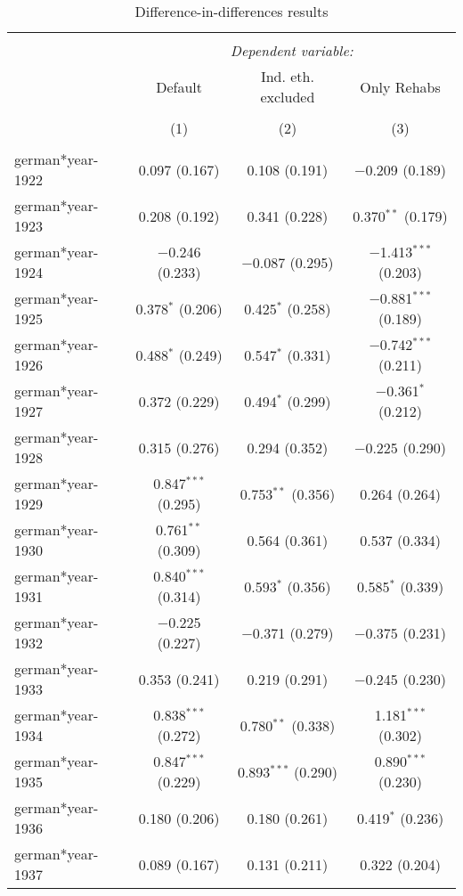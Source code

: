 
\begin{table}[!h] \centering 
  \caption{Difference-in-differences results} 
  \label{dif_table} 
\small 
\begin{tabular}{@{\extracolsep{5pt}}lccc} 
\\[-1.8ex]\hline 
\hline \\[-1.8ex] 
 & \multicolumn{3}{c}{\textit{Dependent variable:}} \\ 
\cline{2-4} 
 & Default & Ind. eth. excluded & Only Rehabs \\ 
\\[-1.8ex] & (1) & (2) & (3)\\ 
\hline \\[-1.8ex] 
 german*year-1922 & 0.097 (0.167) & 0.108 (0.191) & $-$0.209 (0.189) \\ 
  german*year-1923 & 0.208 (0.192) & 0.341 (0.228) & 0.370$^{**}$ (0.179) \\ 
  german*year-1924 & $-$0.246 (0.233) & $-$0.087 (0.295) & $-$1.413$^{***}$ (0.203) \\ 
  german*year-1925 & 0.378$^{*}$ (0.206) & 0.425$^{*}$ (0.258) & $-$0.881$^{***}$ (0.189) \\ 
  german*year-1926 & 0.488$^{*}$ (0.249) & 0.547$^{*}$ (0.331) & $-$0.742$^{***}$ (0.211) \\ 
  german*year-1927 & 0.372 (0.229) & 0.494$^{*}$ (0.299) & $-$0.361$^{*}$ (0.212) \\ 
  german*year-1928 & 0.315 (0.276) & 0.294 (0.352) & $-$0.225 (0.290) \\ 
  german*year-1929 & 0.847$^{***}$ (0.295) & 0.753$^{**}$ (0.356) & 0.264 (0.264) \\ 
  german*year-1930 & 0.761$^{**}$ (0.309) & 0.564 (0.361) & 0.537 (0.334) \\ 
  german*year-1931 & 0.840$^{***}$ (0.314) & 0.593$^{*}$ (0.356) & 0.585$^{*}$ (0.339) \\ 
  german*year-1932 & $-$0.225 (0.227) & $-$0.371 (0.279) & $-$0.375 (0.231) \\ 
  german*year-1933 & 0.353 (0.241) & 0.219 (0.291) & $-$0.245 (0.230) \\ 
  german*year-1934 & 0.838$^{***}$ (0.272) & 0.780$^{**}$ (0.338) & 1.181$^{***}$ (0.302) \\ 
  german*year-1935 & 0.847$^{***}$ (0.229) & 0.893$^{***}$ (0.290) & 0.890$^{***}$ (0.230) \\ 
  german*year-1936 & 0.180 (0.206) & 0.180 (0.261) & 0.419$^{*}$ (0.236) \\ 
  german*year-1937 & 0.089 (0.167) & 0.131 (0.211) & 0.322 (0.204) \\ 

\end{tabular}
\end{table}
